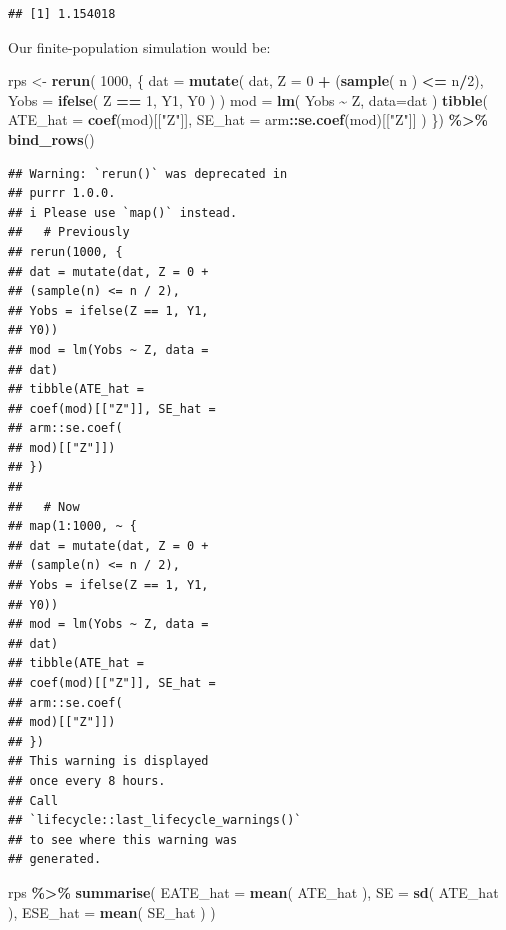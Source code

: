 \documentclass[
]{book}
\newenvironment{Shaded}{\begin{snugshade}}{\end{snugshade}}
\newcommand{\AttributeTok}[1]{\textcolor[rgb]{0.13,0.29,0.53}{#1}}
\newcommand{\DecValTok}[1]{\textcolor[rgb]{0.00,0.00,0.81}{#1}}
\newcommand{\FunctionTok}[1]{\textcolor[rgb]{0.13,0.29,0.53}{\textbf{#1}}}
\newcommand{\NormalTok}[1]{#1}
\newcommand{\OtherTok}[1]{\textcolor[rgb]{0.56,0.35,0.01}{#1}}
\newcommand{\SpecialCharTok}[1]{\textcolor[rgb]{0.81,0.36,0.00}{\textbf{#1}}}
\newcommand{\StringTok}[1]{\textcolor[rgb]{0.31,0.60,0.02}{#1}}
\begin{document}
\begin{verbatim}
## [1] 1.154018
\end{verbatim}

Our finite-population simulation would be:

\begin{Shaded}
\begin{Highlighting}[]
\NormalTok{rps }\OtherTok{\textless{}{-}} \FunctionTok{rerun}\NormalTok{( }\DecValTok{1000}\NormalTok{, \{}
\NormalTok{  dat }\OtherTok{=} \FunctionTok{mutate}\NormalTok{( dat,}
              \AttributeTok{Z =} \DecValTok{0} \SpecialCharTok{+}\NormalTok{ (}\FunctionTok{sample}\NormalTok{( n ) }\SpecialCharTok{\textless{}=}\NormalTok{ n}\SpecialCharTok{/}\DecValTok{2}\NormalTok{),}
              \AttributeTok{Yobs =} \FunctionTok{ifelse}\NormalTok{( Z }\SpecialCharTok{==} \DecValTok{1}\NormalTok{, Y1, Y0 ) )}
\NormalTok{  mod }\OtherTok{=} \FunctionTok{lm}\NormalTok{( Yobs }\SpecialCharTok{\textasciitilde{}}\NormalTok{ Z, }\AttributeTok{data=}\NormalTok{dat )}
  \FunctionTok{tibble}\NormalTok{( }\AttributeTok{ATE\_hat =} \FunctionTok{coef}\NormalTok{(mod)[[}\StringTok{"Z"}\NormalTok{]],}
          \AttributeTok{SE\_hat =}\NormalTok{ arm}\SpecialCharTok{::}\FunctionTok{se.coef}\NormalTok{(mod)[[}\StringTok{"Z"}\NormalTok{]] )}
\NormalTok{  \}) }\SpecialCharTok{\%\textgreater{}\%}
  \FunctionTok{bind\_rows}\NormalTok{()}
\end{Highlighting}
\end{Shaded}

\begin{verbatim}
## Warning: `rerun()` was deprecated in
## purrr 1.0.0.
## i Please use `map()` instead.
##   # Previously
## rerun(1000, {
## dat = mutate(dat, Z = 0 +
## (sample(n) <= n / 2),
## Yobs = ifelse(Z == 1, Y1,
## Y0))
## mod = lm(Yobs ~ Z, data =
## dat)
## tibble(ATE_hat =
## coef(mod)[["Z"]], SE_hat =
## arm::se.coef(
## mod)[["Z"]])
## })
## 
##   # Now
## map(1:1000, ~ {
## dat = mutate(dat, Z = 0 +
## (sample(n) <= n / 2),
## Yobs = ifelse(Z == 1, Y1,
## Y0))
## mod = lm(Yobs ~ Z, data =
## dat)
## tibble(ATE_hat =
## coef(mod)[["Z"]], SE_hat =
## arm::se.coef(
## mod)[["Z"]])
## })
## This warning is displayed
## once every 8 hours.
## Call
## `lifecycle::last_lifecycle_warnings()`
## to see where this warning was
## generated.
\end{verbatim}

\begin{Shaded}
\begin{Highlighting}[]
\NormalTok{rps }\SpecialCharTok{\%\textgreater{}\%} \FunctionTok{summarise}\NormalTok{( }\AttributeTok{EATE\_hat =} \FunctionTok{mean}\NormalTok{( ATE\_hat ),}
                   \AttributeTok{SE =} \FunctionTok{sd}\NormalTok{( ATE\_hat ),}
                   \AttributeTok{ESE\_hat =} \FunctionTok{mean}\NormalTok{( SE\_hat ) )}
\end{Highlighting}
\end{Shaded}
\end{document}
